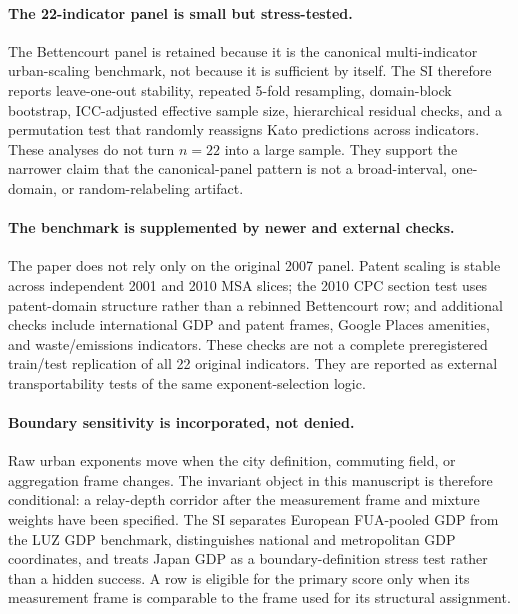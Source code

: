 \paragraph{The 22-indicator panel is small but stress-tested.}
The Bettencourt panel is retained because it is the canonical multi-indicator
urban-scaling benchmark, not because it is sufficient by itself.  The SI
therefore reports leave-one-out stability, repeated 5-fold resampling,
domain-block bootstrap, ICC-adjusted effective sample size, hierarchical
residual checks, and a permutation test that randomly reassigns Kato
predictions across indicators.  These analyses do not turn \(n=22\) into a
large sample.  They support the narrower claim that the canonical-panel
pattern is not a broad-interval, one-domain, or random-relabeling artifact.

\paragraph{The benchmark is supplemented by newer and external checks.}
The paper does not rely only on the original 2007 panel.  Patent scaling is
stable across independent 2001 and 2010 MSA slices; the 2010 CPC section test
uses patent-domain structure rather than a rebinned Bettencourt row; and
additional checks include international GDP and patent frames, Google Places
amenities, and waste/emissions indicators.  These checks are not a complete
preregistered train/test replication of all 22 original indicators.  They are
reported as external transportability tests of the same exponent-selection
logic.

\paragraph{Boundary sensitivity is incorporated, not denied.}
Raw urban exponents move when the city definition, commuting field, or
aggregation frame changes.  The invariant object in this manuscript is
therefore conditional: a relay-depth corridor after the measurement frame and
mixture weights have been specified.  The SI separates European FUA-pooled
GDP from the LUZ GDP benchmark, distinguishes national and metropolitan GDP
coordinates, and treats Japan GDP as a boundary-definition stress test rather
than a hidden success.  A row is eligible for the primary score only when its
measurement frame is comparable to the frame used for its structural
assignment.

